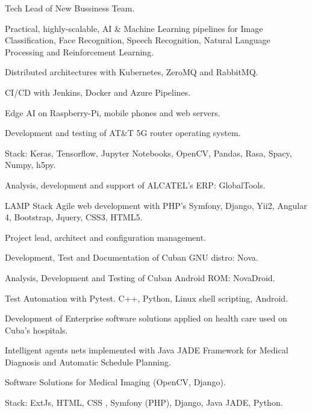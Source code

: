 \documentclass[]{deedy-resume-reversed}
\begin{document}
\begin{minipage}[t]{0.6\textwidth}
\begin{tightemize}
\item Tech Lead of New Bussiness Team.
\item Practical, highly-scalable, AI \& Machine Learning pipelines for Image Classification, Face Recognition, Speech Recognition, Natural Language Processing and Reinforcement Learning.
\item Distributed architectures with Kubernetes, ZeroMQ and RabbitMQ.
\item CI/CD with Jenkins, Docker and Azure Pipelines.
\item Edge AI on Raspberry-Pi, mobile phones and web servers.
\item Development and testing of AT\&T 5G router operating system.
\item Stack: Keras, Tensorflow, Jupyter Notebooks, OpenCV, Pandas, Rasa, Spacy, Numpy, h5py.
\end{tightemize}
\sectionsep

\begin{tightemize}
\item Analysis, development and support of ALCATEL's ERP: GlobalTools.
\item LAMP Stack Agile web development with PHP's Symfony, Django, Yii2, Angular 4, Bootstrap, Jquery, CSS3, HTML5.
\item Project lead, architect and configuration management.
\end{tightemize}
\sectionsep

 \begin{tightemize}
 \item Development, Test and Documentation of Cuban GNU distro: Nova.
 \item Analysis, Development and Testing of Cuban Android ROM: NovaDroid.
 \item Test Automation with Pytest. C++, Python, Linux shell scripting, Android.
 \item Development of Enterprise software solutions applied on health care used on Cuba's hospitals.
 \item Intelligent agents nets implemented with Java JADE Framework for Medical Diagnosis and Automatic Schedule Planning.
 \item Software Solutions for Medical Imaging (OpenCV, Django). 
 \item Stack: ExtJs, HTML, CSS , Symfony (PHP), Django, Java JADE, Python.
 \end{tightemize}
 
 \sectionsep

\end{minipage}
\end{document}
